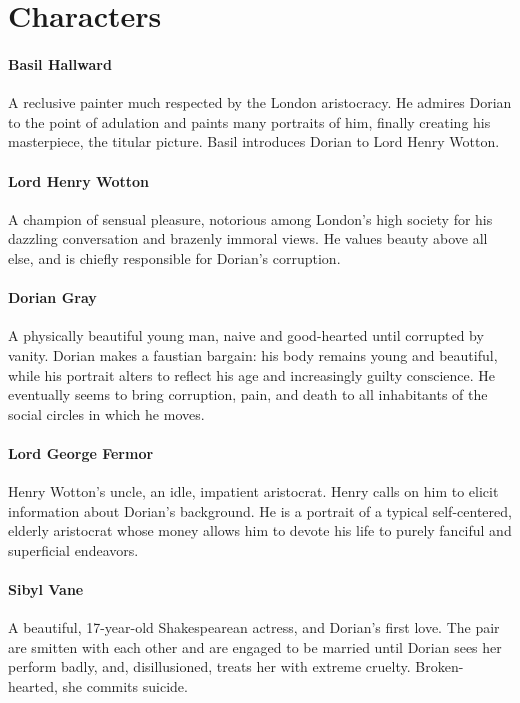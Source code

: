 \documentclass[12pt,twoside,titlepage,a4paper]{article}
\begin{document}
	\section{Characters}
	
	\paragraph{Basil Hallward} A reclusive painter much respected by the London aristocracy. He admires Dorian to the point of adulation and paints many portraits of him, finally creating his masterpiece, the titular picture. Basil introduces Dorian to Lord Henry Wotton.
	
	
	\paragraph{Lord Henry Wotton} A champion of sensual pleasure, notorious among London's high society for his dazzling conversation and brazenly immoral views. He values beauty above all else, and is chiefly responsible for Dorian's corruption.
	
	\paragraph{Dorian Gray} A physically beautiful young man, naive and good-hearted until corrupted by vanity. Dorian makes a faustian bargain: his body remains young and beautiful, while his portrait alters to reflect his age and increasingly guilty conscience. He eventually seems to bring corruption, pain, and death to all inhabitants of the social circles in which he moves. 
	
	\paragraph{Lord George Fermor} Henry Wotton's uncle, an idle, impatient aristocrat. Henry calls on him to elicit information about Dorian's background. He is a portrait of a typical self-centered, elderly aristocrat whose money allows him to devote his life to purely fanciful and superficial endeavors.
	
	\paragraph{Sibyl Vane} A beautiful, 17-year-old Shakespearean actress, and Dorian's first love. The pair are smitten with each other and are engaged to be married until Dorian sees her perform badly, and, disillusioned, treats her with extreme cruelty. Broken-hearted, she commits suicide.
	
\end{document}
